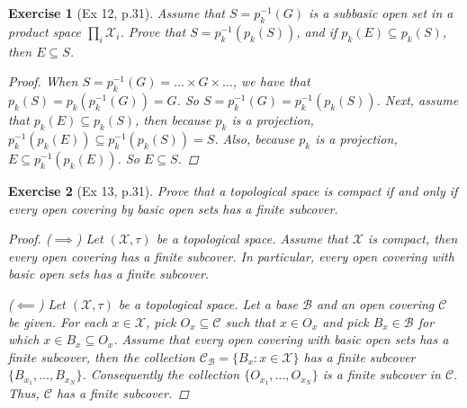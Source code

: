 \documentclass[11pt]{article}
\newtheorem{exercise}{Exercise}
\newcommand{\X}{\mathcal{X}}
\begin{document}
\begin{exercise}[Ex 12, p.31]
	Assume that $S = p^{-1}_k(G)$ is a subbasic open set in a product space $\prod_i \X_i$. Prove that $S = p^{-1}_k(p_k(S))$, and if $p_k(E) \subseteq p_k(S)$, then $E \subseteq S$.
	\begin{proof}
		When $S = p_k^{-1}(G) = \dots \times G \times \dots$, we have that $p_k(S) = p_k(p_k^{-1}(G)) = G$. So $S = p_k^{-1}(G) = p_k^{-1}(p_k(S))$. Next, assume that $p_k(E) \subseteq p_k(S)$, then because $p_k$ is a projection, $p_k^{-1}(p_k(E)) \subseteq p_k^{-1}(p_k(S)) = S$. Also, because $p_k$ is a projection, $E\subseteq p_k^{-1}(p_k(E))$. So $E\subseteq S$.  
	\end{proof}
\end{exercise}

\begin{exercise}[Ex 13, p.31]
	Prove that a topological space is compact if and only if every open covering by basic open sets has a finite subcover.
	\begin{proof}
		($\implies$) Let $(\X,\tau)$ be a topological space. Assume that $\X$ is compact, then every open covering has a finite subcover.  In particular, every open covering with basic open sets has a finite subcover. 
		
		($\impliedby$) Let $(\X,\tau)$ be a topological space. Let a base $\mathcal{B}$ and an open covering $\mathcal{C}$ be given. For each $x\in \X$, pick $O_x \subseteq \mathcal{C}$ such that $x\in O_x$ and pick $B_x \in \mathcal{B}$ for which $x\in B_x \subseteq O_x$. Assume that every open covering with basic open sets has a finite subcover, then the collection $\mathcal{C}_\mathcal{B} = \{ B_x : x\in \X\}$ has a finite subcover $\{B_{x_1},\dots, B_{x_N} \}$. Consequently the collection $\{ O_{x_1},\dots,O_{x_N} \}$ is a finite subcover in $\mathcal{C}$. Thus, $\mathcal{C}$ has a finite subcover.   
	\end{proof}
\end{exercise}
\end{document}
